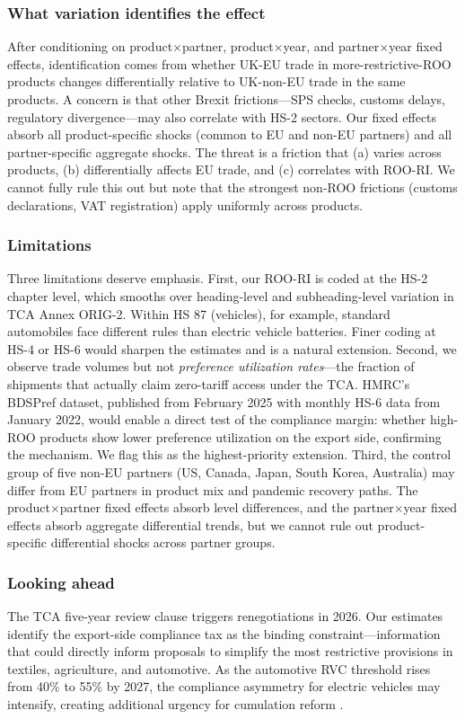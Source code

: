 \documentclass[12pt]{article}
\begin{document}
\subsubsection*{What variation identifies the effect} After conditioning on product$\times$partner, product$\times$year, and partner$\times$year fixed effects, identification comes from whether UK-EU trade in more-restrictive-ROO products changes differentially relative to UK-non-EU trade in the same products. A concern is that other Brexit frictions---SPS checks, customs delays, regulatory divergence---may also correlate with HS-2 sectors. Our fixed effects absorb all product-specific shocks (common to EU and non-EU partners) and all partner-specific aggregate shocks. The threat is a friction that (a) varies across products, (b) differentially affects EU trade, and (c) correlates with ROO-RI. We cannot fully rule this out but note that the strongest non-ROO frictions (customs declarations, VAT registration) apply uniformly across products.

\subsubsection*{Limitations} Three limitations deserve emphasis. First, our ROO-RI is coded at the HS-2 chapter level, which smooths over heading-level and subheading-level variation in TCA Annex ORIG-2. Within HS 87 (vehicles), for example, standard automobiles face different rules than electric vehicle batteries. Finer coding at HS-4 or HS-6 would sharpen the estimates and is a natural extension. Second, we observe trade volumes but not \textit{preference utilization rates}---the fraction of shipments that actually claim zero-tariff access under the TCA. HMRC's BDSPref dataset, published from February 2025 with monthly HS-6 data from January 2022, would enable a direct test of the compliance margin: whether high-ROO products show lower preference utilization on the export side, confirming the mechanism. We flag this as the highest-priority extension. Third, the control group of five non-EU partners (US, Canada, Japan, South Korea, Australia) may differ from EU partners in product mix and pandemic recovery paths. The product$\times$partner fixed effects absorb level differences, and the partner$\times$year fixed effects absorb aggregate differential trends, but we cannot rule out product-specific differential shocks across partner groups.

\subsubsection*{Looking ahead} The TCA five-year review clause triggers renegotiations in 2026. Our estimates identify the export-side compliance tax as the binding constraint---information that could directly inform proposals to simplify the most restrictive provisions in textiles, agriculture, and automotive. As the automotive RVC threshold rises from 40\% to 55\% by 2027, the compliance asymmetry for electric vehicles may intensify, creating additional urgency for cumulation reform \citep{handley2017}.
\end{document}

